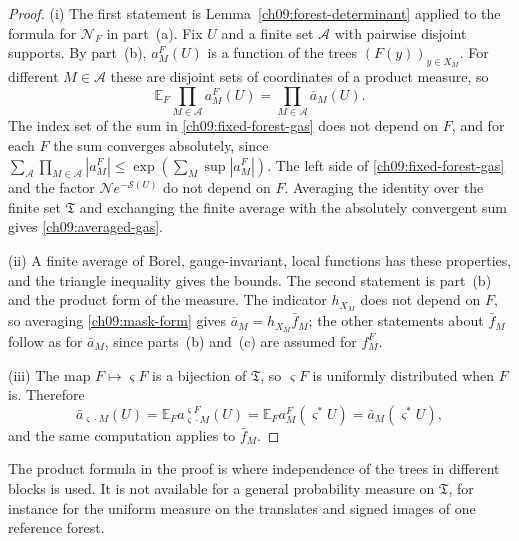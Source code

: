 \begin{proof}
(i) The first statement is Lemma~\ref{ch09:forest-determinant} applied
to the formula for $\mathscr N_F$ in part~(a). Fix $U$ and a finite set
$\mathcal A$ with pairwise disjoint supports. By part~(b), $a_M^F(U)$
is a function of the trees $(F(y))_{y\in X_M}$. For different
$M\in\mathcal A$ these are disjoint sets of coordinates of a product
measure, so
\[
 \mathbb E_F\prod_{M\in\mathcal A}a_M^F(U)
       =\prod_{M\in\mathcal A}\bar a_M(U).
\]
The index set of the sum in \eqref{ch09:fixed-forest-gas} does not
depend on $F$, and for each $F$ the sum converges absolutely, since
$\sum_{\mathcal A}\prod_{M\in\mathcal A}|a_M^F|
\le\exp(\sum_M\sup|a_M^F|)$. The left side of
\eqref{ch09:fixed-forest-gas} and the factor
$\mathscr Ne^{-\mathscr S(U)}$ do not depend on $F$. Averaging the
identity over the finite set $\mathfrak T$ and exchanging the finite
average with the absolutely convergent sum gives
\eqref{ch09:averaged-gas}.

(ii) A finite average of Borel, gauge-invariant, local functions has
these properties, and the triangle inequality gives the bounds. The
second statement is part~(b) and the product form of the measure. The
indicator $h_{X_M}$ does not depend on $F$, so averaging
\eqref{ch09:mask-form} gives $\bar a_M=h_{X_M}\bar f_M$; the other
statements about $\bar f_M$ follow as for $\bar a_M$, since
parts~(b) and~(c) are assumed for $f_M^F$.

(iii) The map $F\mapsto\varsigma F$ is a bijection of $\mathfrak T$,
so $\varsigma F$ is uniformly distributed when $F$ is. Therefore
\[
 \bar a_{\varsigma\cdot M}(U)
     =\mathbb E_Fa^{\varsigma F}_{\varsigma\cdot M}(U)
     =\mathbb E_Fa^F_M(\varsigma^*U)=\bar a_M(\varsigma^*U),
\]
and the same computation applies to $\bar f_M$.
\end{proof}

The product formula in the proof is where independence of the trees in
different blocks is used. It is not available for a general probability
measure on $\mathfrak T$, for instance for the uniform measure on the
translates and signed images of one reference forest.

